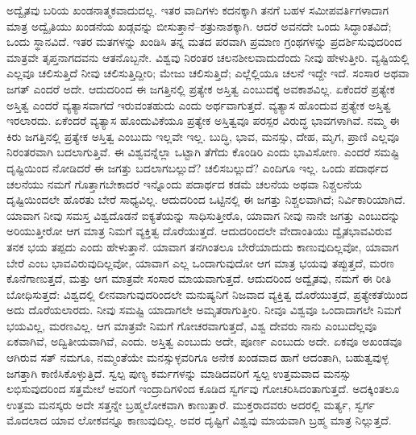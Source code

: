 ಅದ್ವೈತವು ಬರಿಯ ಖಂಡನಾತ್ಮಕವಾದುದಲ್ಲ. ಇತರ ವಾದಿಗಳು ಕದನಕ್ಕಾಗಿ ತನಗೆ ಬಹಳ ಸಮೀಪವರ್ತಿಗಳಾದಾಗ ಮಾತ್ರ ಅದ್ವೈತಿಯು ಖಂಡನೆಯ ಖಡ್ಗವನ್ನು ಬೀಸುತ್ತಾನೆ–ಶತ್ರುನಾಶಕ್ಕಾಗಿ. ಆದರೆ ಅವನದೇ ಒಂದು ಸಿದ್ಧಾಂತವಿದೆ; ಒಂದು ಸ್ಥಾನವಿದೆ. ಇತರ ಮತಗಳನ್ನು ಖಂಡಿಸಿ ತನ್ನ ಮತದ ಪರವಾಗಿ ಪ್ರಮಾಣ ಗ್ರಂಥಗಳನ್ನು ಪ್ರದರ್ಶಿಸುವುದರಿಂದ ಮಾತ್ರವೇ ತೃಪ್ತನಾಗದವನು ಆತನೊಬ್ಬನೇ. ವಿಶ್ವವು ನಿರಂತರ ಚಲನಶೀಲವಾದುದೆಂದು ನೀವು ಹೇಳುತ್ತೀರಿ. ವ್ಯಷ್ಟಿಯಲ್ಲಿ ಎಲ್ಲವೂ ಚಲಿಸುತ್ತಿದೆ ನೀವು ಚಲಿಸುತ್ತಿದ್ದೀರಿ; ಮೇಜು ಚಲಿಸುತ್ತಿದೆ; ಎಲ್ಲೆಲ್ಲಿಯೂ ಚಲನೆ ಇದ್ದೇ ಇದೆ. ಸಂಸಾರ ಅಥವಾ ಜಗತ್​ ಎಂದರೆ ಅದೇ. ಆದುದರಿಂದ ಈ ಜಗತ್ತಿನಲ್ಲಿ ಪ್ರತ್ಯೇಕ ಅಸ್ತಿತ್ವ  ಎಂಬುದಕ್ಕೆ ಅವಕಾಶವಿಲ್ಲ. ಏಕೆಂದರೆ ಪ್ರತ್ಯೇಕ ಅಸ್ತಿತ್ವ ಎಂದರೆ ವ್ಯತ್ಯಾಸವಾಗದೆ ಇರುವಂತಹುದು ಎಂದು ಅರ್ಥವಾಗುತ್ತದೆ. ವ್ಯತ್ಯಾಸ ಹೊಂದುವ ಪ್ರತ್ಯೇಕ ಅಸ್ತಿತ್ವ ಇರಲಾರದು. ಏಕೆಂದರೆ ವ್ಯತ್ಯಾಸ ಹೊಂದುವಿಕೆಯೂ ಪ್ರತ್ಯೇಕ ಅಸ್ತಿತ್ವವೂ ಪರಸ್ಪರ ವಿರುದ್ಧ ಭಾವಗಳಾಗಿವೆ. ನಮ್ಮ ಈ ಕಿರು ಜಗತ್ತಿನಲ್ಲಿ ಪ್ರತ್ಯೇಕ ಅಸ್ತಿತ್ವ ಎಂಬುದು ಇಲ್ಲವೇ ಇಲ್ಲ. ಬುದ್ಧಿ, ಭಾವ, ಮನಸ್ಸು, ದೇಹ, ಮೃಗ, ಪ್ರಾಣಿ ಎಲ್ಲವೂ ನಿರಂತರವಾಗಿ ಬದಲಾಗುತ್ತಿವೆ. ಈ ವಿಶ್ವವನ್ನೆಲ್ಲಾ ಒಟ್ಟಾಗಿ ತೆಗೆದು ಕೊಂಡಿರಿ ಎಂದು ಭಾವಿಸೋಣ. ಎಂದರೆ ಸಮಷ್ಟಿ ದೃಷ್ಟಿಯಿಂದ ನೋಡಿದರೆ ಈ ಜಗತ್ತು ಬದಲಾಗಬಲ್ಲುದೆ? ಚಲಿಸಬಲ್ಲುದೆ? ಎಂದಿಗೂ ಇಲ್ಲ. ಒಂದು ಪದಾರ್ಥದ ಚಲನೆಯು ನಮಗೆ ಗೊತ್ತಾಗಬೇಕಾದರೆ ಇನ್ನೊಂದು ಪದಾರ್ಥದ ಕಡಮೆ ಚಲನೆಯ ಅಥವಾ ನಿಶ್ಚಲನೆಯ ದೃಷ್ಟಿಯಿಂದಲೇ ಹೊರತು ಬೇರೆ ಸಾಧ್ಯವಿಲ್ಲ. ಆದುದರಿಂದ ಒಟ್ಟಿನಲ್ಲಿ ಈ ಜಗತ್ತು ನಿಶ್ಚಲವಾಗಿದೆ; ನಿರ್ವಿಕಾರಿಯಾಗಿದೆ. ಯಾವಾಗ ನೀವು ಸಮಸ್ತ ವಿಶ್ವದೊಡನೆ ಐಕ್ಯತೆಯನ್ನು ಸಾಧಿಸುತ್ತೀರೊ, ಯಾವಾಗ ನೀವು ನಾನೇ ಜಗತ್ತು ಎಂಬುದನ್ನು ಅರಿಯುತ್ತೀರೋ ಆಗ ಮಾತ್ರ ನಿಮಗೆ ವ್ಯಕ್ತಿತ್ವ ದೊರೆಯುತ್ತದೆ. ಆದುದರಿಂದಲೇ ವೇದಾಂತಿಯು ದ್ವೈತಭಾವವಿರುವ ತನಕ ಭಯ ತಪ್ಪದು ಎಂದು ಹೇಳುತ್ತಾನೆ. ಯಾವಾಗ ತನಗಿಂತಲೂ ಬೇರೆಯಾದುದು ಕಾಣುವುದಿಲ್ಲವೋ, ಯಾವಾಗ ಬೇರೆ ಎಂಬ ಭಾವವಿರುವುದಿಲ್ಲವೋ, ಯಾವಾಗ ಎಲ್ಲ ಒಂದಾಗುವುದೋ ಆಗ ಮಾತ್ರ ಭಯವು ತಪ್ಪುತ್ತದೆ, ಮರಣ ಕೊನೆಗಾಣುತ್ತದೆ, ಮತ್ತು ಆಗ ಮಾತ್ರವೇ ಸಂಸಾರ ಮಾಯವಾಗುತ್ತದೆ. ಆದುದರಿಂದ ಅದ್ವೈತವು, ನಮಗೆ ಈ ರೀತಿ ಬೋಧಿಸುತ್ತದೆ: ವಿಶ್ವದಲ್ಲಿ ಲೀನವಾಗುವುದರಿಂದಲೇ ಮನುಷ್ಯನಿಗೆ ನಿಜವಾದ ವ್ಯಕ್ತಿತ್ವ ದೊರೆಯುತ್ತದೆ, ಪ್ರತ್ಯೇಕತೆಯಿಂದ ಅದು ದೊರೆಯಲಾರದು. ನೀವು ಸಮಷ್ಟಿ ಯಾದಾಗಲೇ ಅಮೃತರಾಗುತ್ತೀರಿ. ನೀವೂ ವಿಶ್ವವೂ ಒಂದಾದಾಗಲೇ ನಿಮಗೆ ಭಯವಿಲ್ಲ, ಮರಣವಿಲ್ಲ. ಆಗ ಮಾತ್ರವೇ ನಿಮಗೆ ಗೋಚರವಾಗುತ್ತದೆ, ವಿಶ್ವ ದೇವರು ನಾನು ಎಂಬುದೆಲ್ಲವೂ ಏಕವಾಗಿವೆ, ಅದ್ವಿತೀಯವಾಗಿವೆ, ಎಂದು. ಅಸ್ತಿತ್ವ ಎಂಬುದು ಅದೇ, ಪೂರ್ಣ ಎಂಬುದು ಅದೇ. ಏಕವೂ ಅಖಂಡವೂ ಆಗಿರುವ ಸತ್​ ನಮಗೂ, ನಮ್ಮಂತೆಯೇ ಮನಸ್ಸುಳ್ಳವರಿಗೂ ಅನೇಕ ಖಂಡವಾದ ಹಾಗೆ ಆದಂತಾಗಿ, ಬಹುತ್ವವುಳ್ಳ ಜಗತ್ತಾಗಿ ಕಾಣಿಸಿಕೊಳ್ಳುತ್ತಿದೆ. ಸ್ವಲ್ಪ ಪುಣ್ಯ ಕರ್ಮಗಳನ್ನು ಮಾಡಿದವರಿಗೆ ಸ್ವಲ್ಪ ಉತ್ತಮವಾದ ಮನಸ್ಸು ಲಭಿಸುವುದರಿಂದ ಸತ್ತಮೇಲೆ ಅವರಿಗೆ ಇಂದ್ರಾದಿಗಳಿಂದ ಕೂಡಿದ ಸ್ವರ್ಗವು ಗೋಚರಿಸಿದಂತಾಗುತ್ತದೆ. ಅದಕ್ಕಿಂತಲೂ ಉತ್ತಮ ಮನಸ್ಕರು ಅದೇ ಸತ್ತನ್ನೇ ಬ್ರಹ್ಮಲೋಕವಾಗಿ ಕಾಣುತ್ತಾರೆ. ಮುಕ್ತರಾದವರು ಅದರಲ್ಲಿ ಮರ್ತ್ಯ, ಸ್ವರ್ಗ ಮೊದಲಾದ ಯಾವ ಲೋಕವನ್ನೂ ಕಾಣುವುದಿಲ್ಲ. ಅವರ ದೃಷ್ಟಿಗೆ ವಿಶ್ವವು ಮಾಯವಾಗಿ ಬ್ರಹ್ಮ ಮಾತ್ರ ನಿಲ್ಲುತ್ತದೆ.

